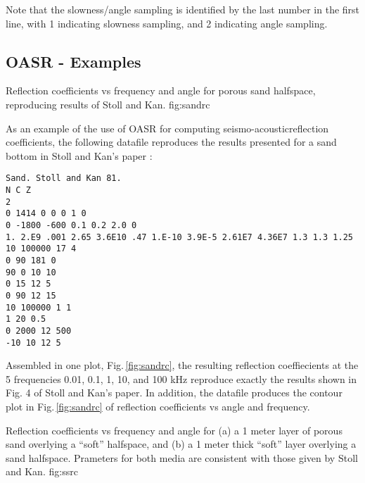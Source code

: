 \noindent Note that the slowness/angle sampling is identified by the
last number in the first line, with 1 indicating slowness sampling,
and 2 indicating angle sampling. 


\subsection{OASR - Examples}

{Reflection coefficients vs frequency and angle for porous
       sand halfspace, reproducing results of Stoll and Kan.}
{fig:sandrc}

As an example of the use of OASR for computing
seismo-acousticreflection coefficients, the following datafile
reproduces the results presented for a sand bottom in Stoll and Kan's
paper \cite{Stoll_81}:

\begin{verbatim}
Sand. Stoll and Kan 81.
N C Z
2
0 1414 0 0 0 1 0
0 -1800 -600 0.1 0.2 2.0 0
1. 2.E9 .001 2.65 3.6E10 .47 1.E-10 3.9E-5 2.61E7 4.36E7 1.3 1.3 1.25
10 100000 17 4
0 90 181 0
90 0 10 10
0 15 12 5
0 90 12 15
10 100000 1 1
1 20 0.5
0 2000 12 500
-10 10 12 5
\end{verbatim}

Assembled in one plot, Fig.\,\ref{fig:sandrc}, the resulting reflection coeffiecients at the 5
frequencies 0.01, 0.1, 1, 10, and 100 kHz reproduce exactly the
results shown in Fig. 4 of Stoll and Kan's paper. In addition, the
datafile produces the contour plot in Fig.\,\ref{fig:sandrc} of reflection coefficients vs angle
and frequency.

{Reflection coefficients vs frequency and angle for (a) a 1
       meter layer of porous
       sand overlying a ``soft'' halfspace, and (b) a 1 meter thick
       ``soft'' layer overlying a sand halfspace. Prameters for both
       media are consistent with those given by Stoll and Kan.}
{fig:ssrc}


